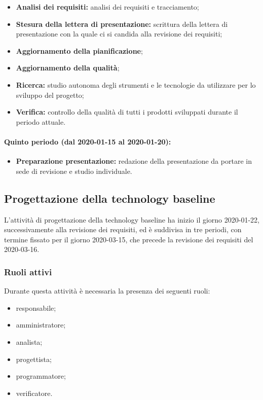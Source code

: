 				\begin{itemize}
					\item \textbf{Analisi dei requisiti:} analisi dei requisiti e tracciamento;
					\item \textbf{Stesura della lettera di presentazione:} scrittura della lettera di presentazione con la quale ci si candida alla revisione dei requisiti;
					\item \textbf{Aggiornamento della pianificazione};
					\item \textbf{Aggiornamento della qualità};
					\item \textbf{Ricerca:} studio autonoma degli strumenti e le tecnologie da utilizzare per lo sviluppo del progetto;
					\item \textbf{Verifica:} controllo della qualità di tutti i prodotti sviluppati durante il periodo attuale.
				\end{itemize}
			
			\paragraph{Quinto periodo (dal 2020-01-15 al 2020-01-20):}
			
				\begin{itemize}
					\item \textbf{Preparazione presentazione:} redazione della presentazione da portare in sede di revisione e studio individuale.
				\end{itemize}

		\subsection{Progettazione della technology baseline}
	
			L'attività di progettazione della technology baseline ha inizio il giorno 2020-01-22, successivamente alla revisione dei requisiti, ed è suddivisa in tre periodi, con termine fissato per il giorno 2020-03-15, che precede la revisione dei requisiti del 2020-03-16.
			
			\subsubsection{Ruoli attivi}
			
				Durante questa attività è necessaria la presenza dei seguenti ruoli:
				\begin{itemize}
					\item responsabile;
					\item amministratore;
					\item analista;
					\item progettista;
					\item programmatore;
					\item verificatore.
				\end{itemize}
			
